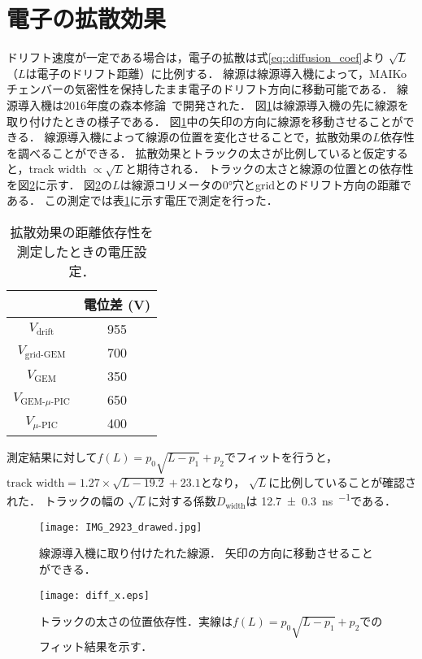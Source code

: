 \documentclass[../master]{subfiles}
\begin{document}
\section{電子の拡散効果}
ドリフト速度が一定である場合は，電子の拡散は式\eqref{eq::diffusion_coef}より
$\sqrt{L}$（$L$は電子のドリフト距離）に比例する．
線源は線源導入機によって，MAIKo チェンバーの気密性を保持したまま電子のドリフト方向に移動可能である．
線源導入機は2016年度の森本修論~\cite{morimoto_thesis}で開発された．
図\ref{pic::source_insirtion}は線源導入機の先に線源を取り付けたときの様子である．
図\ref{pic::source_insirtion}中の矢印の方向に線源を移動させることができる．
線源導入機によって線源の位置を変化させることで，拡散効果の$L$依存性を調べることができる．
拡散効果とトラックの太さが比例していると仮定すると，track width $\propto\sqrt{L}$と期待される．
トラックの太さと線源の位置との依存性を図\ref{fig::diff_x}に示す．
図\ref{fig::diff_x}の$L$は線源コリメータの\ang{0}穴とgridとのドリフト方向の距離である．
この測定では表\ref{tab::config_diffusion_meas}に示す電圧で測定を行った．
\begin{table}
  \centering
  \caption{拡散効果の距離依存性を測定したときの電圧設定．}
  \label{tab::config_diffusion_meas}
  \begin{tabular}{cc}
    \toprule
    & 電位差 (\si{\volt}) \\
    \midrule
    $V_{\text{drift}}$ & 955 \\
    $V_{\text{grid-GEM}}$ & 700 \\
    $V_{\text{GEM}}$ & 350 \\
    $V_{\text{GEM-$\mu$-PIC}}$ & 650 \\
    $V_{\mu\text{-PIC}}$ & 400 \\
    \bottomrule
  \end{tabular}
\end{table}
測定結果に対して$f(L) = p_{0}\sqrt{L-p_{1}}+p_{2}$でフィットを行うと，
$\text{track width} = 1.27\times\sqrt{L-19.2}+23.1$となり，
$\sqrt{L}$に比例していることが確認された．
トラックの幅の $\sqrt{L}$に対する係数$D_{\text{width}}$は
\SI{12.7\pm0.3}{\nano\second\per\sqrt{\milli\metre}}である．
\begin{figure}
  \centering
  \texttt{[image: IMG\_2923\_drawed.jpg]}
  \caption[線源導入機に取り付けたれた線源．]
          {線源導入機に取り付けたれた線源．
          矢印の方向に移動させることができる．}
  \label{pic::source_insirtion}
\end{figure}
\begin{figure}
  \centering
  \texttt{[image: diff\_x.eps]}
  \caption{トラックの太さの位置依存性．実線は$f(L) = p_{0}\sqrt{L-p_{1}}+p_{2}$でのフィット結果を示す．}
  \label{fig::diff_x}
\end{figure}
\end{document}
